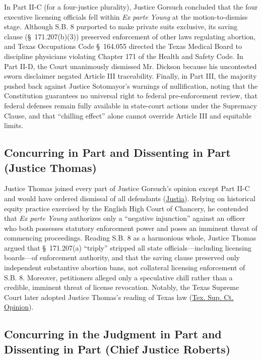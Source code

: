 \documentclass[12pt]{article}
\begin{document}
In Part II-C (for a four-justice plurality), Justice Gorsuch concluded that the four executive licensing officials fell within \textit{Ex parte Young} at the motion-to-dismiss stage. Although S.B. 8 purported to make private suits exclusive, its saving clause (\S~171.207(b)(3)) preserved enforcement of other laws regulating abortion, and Texas Occupations Code \S~164.055 directed the Texas Medical Board to discipline physicians violating Chapter 171 of the Health and Safety Code. In Part II-D, the Court unanimously dismissed Mr. Dickson because his uncontested sworn disclaimer negated Article III traceability. Finally, in Part III, the majority pushed back against Justice Sotomayor's warnings of nullification, noting that the Constitution guarantees no universal right to federal pre-enforcement review, that federal defenses remain fully available in state-court actions under the Supremacy Clause, and that ``chilling effect'' alone cannot override Article III and equitable limits.

\subsection{Concurring in Part and Dissenting in Part (Justice Thomas)}

Justice Thomas joined every part of Justice Gorsuch's opinion except Part II-C and would have ordered dismissal of all defendants (\href{https://supreme.justia.com/cases/federal/us/595/21-463/}{Justia}). Relying on historical equity practice exercised by the English High Court of Chancery, he contended that \textit{Ex parte Young} authorizes only a ``negative injunction'' against an officer who both possesses statutory enforcement power and poses an imminent threat of commencing proceedings. Reading S.B. 8 as a harmonious whole, Justice Thomas argued that \S~171.207(a) ``triply'' stripped all state officials---including licensing boards---of enforcement authority, and that the saving clause preserved only independent substantive abortion bans, not collateral licensing enforcement of S.B. 8. Moreover, petitioners alleged only a speculative chill rather than a credible, imminent threat of license revocation. Notably, the Texas Supreme Court later adopted Justice Thomas's reading of Texas law (\href{https://www.txcourts.gov/media/1453763/220033.pdf}{Tex. Sup. Ct. Opinion}).

\subsection{Concurring in the Judgment in Part and Dissenting in Part (Chief Justice Roberts)}
\end{document}
